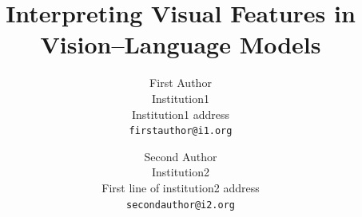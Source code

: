 \documentclass[10pt,twocolumn,letterpaper]{article}
\title{Interpreting Visual Features in Vision--Language Models}
\author{First Author\\
Institution1\\
Institution1 address\\
{\tt\small firstauthor@i1.org}
\and
Second Author\\
Institution2\\
First line of institution2 address\\
{\tt\small secondauthor@i2.org}
}
\begin{document}
\maketitle
    




{
    \small
    
    
}

% 

\ifdefined\pairedsupplement


\fi
\end{document}
